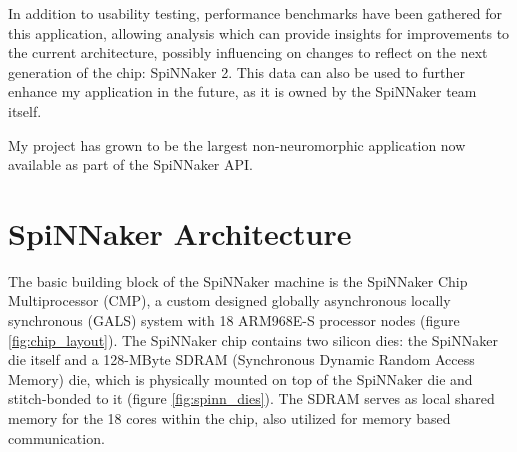 In addition to usability testing, performance benchmarks have been gathered for this application, allowing analysis which can provide insights for improvements to the current architecture, possibly influencing on changes to reflect on the next generation of the chip: SpiNNaker 2. This data can also be used to further enhance my application in the future, as it is owned by the SpiNNaker team itself.

My project has grown to be the largest non-neuromorphic application now available as part of the SpiNNaker API.

\section{SpiNNaker Architecture}

The basic building block of the SpiNNaker machine is the SpiNNaker Chip Multiprocessor (CMP), a custom designed globally asynchronous locally synchronous (GALS) system with 18 ARM968E-S processor nodes (figure \ref{fig:chip_layout}). \cite{painkras}
The SpiNNaker chip contains two silicon dies: the SpiNNaker die itself and a 128-MByte SDRAM (Synchronous Dynamic Random Access Memory) die, which is physically mounted on top of the SpiNNaker die and stitch-bonded to it (figure \ref{fig:spinn_dies}). \cite{spinnchip} The SDRAM serves as local shared memory for the 18 cores within the chip, also utilized for memory based communication. \cite{datasheet}

